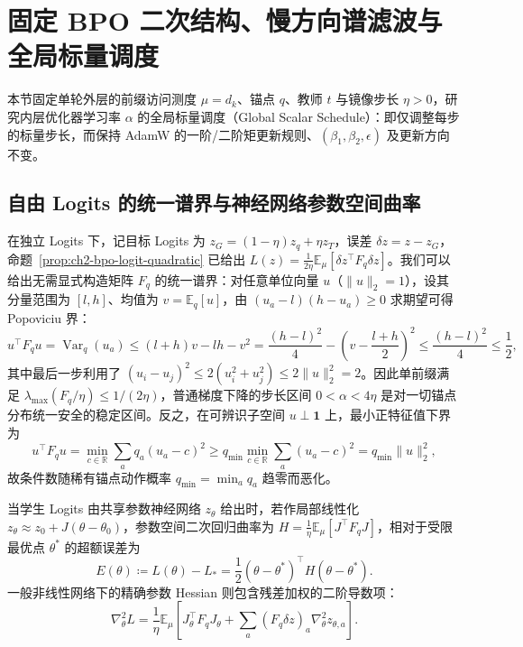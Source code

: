 \documentclass[lang=cn,scheme=chinese,openany]{elegantbook}
\newcommand{\E}{\mathbb E}
\newcommand{\R}{\mathbb R}
\begin{document}
\section{固定 BPO 二次结构、慢方向谱滤波与全局标量调度}
\label{dyn:scalar}

本节固定单轮外层的前缀访问测度 $\mu=d_k$、锚点 $q$、教师 $t$ 与镜像步长 $\eta>0$，研究内层优化器学习率 $\alpha$ 的全局标量调度（Global Scalar Schedule）：即仅调整每步的标量步长，而保持 AdamW 的一阶/二阶矩更新规则、$(\beta_1,\beta_2,\epsilon)$ 及更新方向不变。

\subsection{自由 Logits 的统一谱界与神经网络参数空间曲率}

在独立 Logits 下，记目标 Logits 为 $z_G=(1-\eta)z_q+\eta z_T$，误差 $\delta z=z-z_G$，命题~\ref{prop:ch2-bpo-logit-quadratic} 已给出 $L(z)=\frac{1}{2\eta}\E_\mu[\delta z^\top F_q\delta z]$。我们可以给出无需显式构造矩阵 $F_q$ 的统一谱界：对任意单位向量 $u$（$\|u\|_2=1$），设其分量范围为 $[l,h]$、均值为 $v=\E_q[u]$，由 $(u_a-l)(h-u_a)\ge 0$ 求期望可得 Popoviciu 界：
\begin{equation}
u^\top F_q u=\operatorname{Var}_q(u_a)\le(l+h)v-lh-v^2
=\frac{(h-l)^2}{4}-\left(v-\frac{l+h}{2}\right)^2
\le\frac{(h-l)^2}{4}\le\frac12,
\end{equation}
其中最后一步利用了 $(u_i-u_j)^2\le 2(u_i^2+u_j^2)\le 2\|u\|_2^2=2$。因此单前缀满足 $\lambda_{\max}(F_q/\eta)\le 1/(2\eta)$，普通梯度下降的步长区间 $0<\alpha<4\eta$ 是对一切锚点分布统一安全的稳定区间。反之，在可辨识子空间 $u\perp\mathbf1$ 上，最小正特征值下界为
\begin{equation}
u^\top F_q u=\min_{c\in\R}\sum_a q_a(u_a-c)^2
\ge q_{\min}\min_{c\in\R}\sum_a(u_a-c)^2=q_{\min}\|u\|_2^2,
\end{equation}
故条件数随稀有锚点动作概率 $q_{\min}=\min_a q_a$ 趋零而恶化。

当学生 Logits 由共享参数神经网络 $z_\theta$ 给出时，若作局部线性化 $z_\theta\approx z_0+J(\theta-\theta_0)$，参数空间二次回归曲率为 $H=\frac1\eta\E_\mu[J^\top F_q J]$，相对于受限最优点 $\theta^*$ 的超额误差为
\begin{equation}
E(\theta)\coloneqq L(\theta)-L_*=
\frac12(\theta-\theta^*)^\top H(\theta-\theta^*).
\end{equation}
一般非线性网络下的精确参数 Hessian 则包含残差加权的二阶导数项：
\begin{equation}
\nabla_\theta^2 L=
\frac1\eta\E_\mu\left[J_\theta^\top F_q J_\theta+
\sum_a(F_q\delta z)_a\nabla_\theta^2 z_{\theta,a}\right].
\end{equation}
\end{document}
